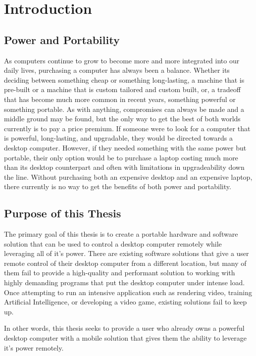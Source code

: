 \chapter{Introduction}

\label{Chapter1}

\section{Power and Portability}

As computers continue to grow to become more and more integrated into our daily lives, purchasing a computer has always been a balance.
Whether its deciding between something cheap or something long-lasting, a machine that is pre-built or a machine that is custom tailored and custom built, or, a tradeoff that has become much more common in recent years, something powerful or something portable.
As with anything, compromises can always be made and a middle ground may be found, but the only way to get the best of both worlds currently is to pay a price premium.
If someone were to look for a computer that is powerful, long-lasting, and upgradable, they would be directed towards a desktop computer.
However, if they needed something with the same power but portable, their only option would be to purchase a laptop costing much more than its desktop counterpart and often with limitations in upgradeability down the line.
Without purchasing both an expensive desktop and an expensive laptop, there currently is no way to get the benefits of both power and portability.


\section{Purpose of this Thesis}

The primary goal of this thesis is to create a portable hardware and software solution that can be used to control a desktop computer remotely while leveraging all of it's power.
There are existing software solutions that give a user remote control of their desktop computer from a different location, but many of them fail to provide a high-quality and performant solution to working with highly demanding programs that put the desktop computer under intense load.
Once attempting to run an intensive application such as rendering video, training Artificial Intelligence, or developing a video game, existing solutions fail to keep up.

In other words, this thesis seeks to provide a user who already owns a powerful desktop computer with a mobile solution that gives them the ability to leverage it's power remotely.


